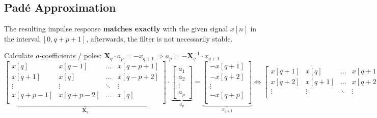 \subsection{Padé Approximation}
The resulting impulse response \textbf{matches exactly} with the given signal $x[n]$ in the interval $[0, q + p + 1]$,
afterwards, the filter is not necessarily stable.

	\renewcommand{\arraystretch}{1.0}
	\begin{aufzaehlung}
  		\item Calculate $a$-coefficients / poles: $\bm X_q \cdot a_p = -x_{q+1} \Longrightarrow a_p = - \bm X_q^{-1} \cdot x_{q+1}$  \small $$
		\underbrace{ \begin{bmatrix}
    		x[q]     & x[q-1]   & \hdots & x[q-p+1] \\                                   
    		x[q+1]   & x[q]     & \hdots & x[q-p+2] \\
    		\vdots   & \vdots   & \ddots & \vdots \\                             
    		x[q+p-1] & x[q+p-2] & \hdots & x[q] \\
		\end{bmatrix}  
		}_{\bm  X_q} \cdot 
		\underbrace{\begin{bmatrix}
    		a_1 \\
    		a_2 \\
    		\vdots \\
    		a_p
		\end{bmatrix}  }_{a_p} = \underbrace{\begin{bmatrix}
    		-x [q+1]\\            
    		-x [q+2]\\
    		\vdots \\
    		-x [q+p]\\
		\end{bmatrix}}_{x_{q+1}}  \Longleftrightarrow 
		\begin{bmatrix}
    		x[q+1] & x[q] & \hdots & x[q+1-p] \\                                   
    		x[q+2] & x[q+1] & \hdots & x[q+2-p] \\
    		\vdots & \vdots & \ddots & \vdots \\                             

\end{bmatrix}$$
\end{aufzaehlung}
